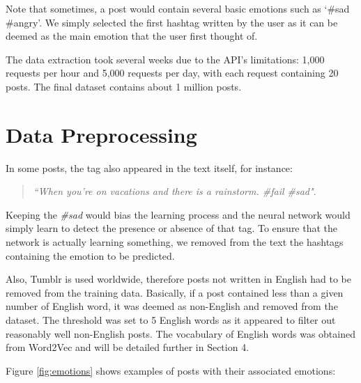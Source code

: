 Note that sometimes, a post would contain several basic emotions such as `\#sad \#angry'. We simply selected the first hashtag written by the user as it can be deemed as the main emotion that the user first thought of.

The data extraction took several weeks due to the API's limitations: 1,000 requests per hour and 5,000 requests per day, with each request containing 20 posts. The final dataset contains about 1 million posts.

\section{Data Preprocessing}
In some posts, the tag also appeared in the text itself, for instance:
\begin{quote}
\textit{``When you're on vacations and there is a rainstorm. \#fail \#sad"}.
\end{quote}
Keeping the \textit{\#sad} would bias the learning process and the neural network would simply learn to detect the presence or absence of that tag. To ensure that the network is actually learning something, we removed from the text the hashtags containing the emotion to be predicted.

Also, Tumblr is used worldwide, therefore posts not written in English had to be removed from the training data. Basically, if a post contained less than a given number of English word, it was deemed as non-English and removed from the dataset. The threshold was set to 5 English words as it appeared to filter out reasonably well non-English posts. The vocabulary of English words was obtained from Word2Vec and will be detailed further in Section 4.

Figure \ref{fig:emotions} shows examples of posts with their associated emotions:

